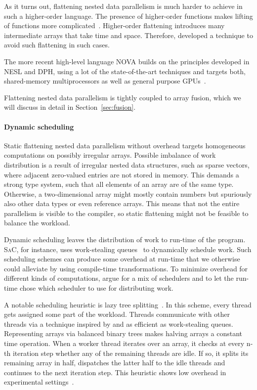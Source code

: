 \documentclass[a4paper]{article}
\newcommand{\sac}{S\textsc{a}C}
\begin{document}
As it turns out, flattening nested data parallelism is much harder to
achieve in such a higher-order language. The presence of higher-order
functions makes lifting of functions more
complicated~\cite{Lippmeier:2012:WEH:2364527.2364564}. Higher-order
flattening introduces many intermediate arrays that take time and
space. Therefore, \citet{Keller:2012:VA:2364506.2364512} developed a
technique to avoid such flattening in such cases.

The more recent high-level language NOVA builds on the principles
developed in NESL and DPH, using a lot of the state-of-the-art
techniques and targets both, shared-memory multiprocessors as well as
general purpose GPUs~\cite{Collins:2014:NFL:2627373.2627375}.

Flattening nested data parallelism is tightly coupled to array fusion,
which we will discuss in detail in Section~\ref{sec:fusion}.

\paragraph{Dynamic scheduling}

Static flattening nested data parallelism without overhead targets
homogeneous computations on possibly irregular arrays. Possible
imbalance of work distribution is a result of irregular nested data
structures, such as sparse vectors, where adjacent zero-valued entries
are not stored in memory. This demands a strong type system, such that
all elements of an array are of the same type. Otherwise, a
two-dimensional array might mostly contain numbers but spuriously also
other data types or even reference arrays. This means that not the
entire parallelism is visible to the compiler, so static flattening
might not be feasible to balance the workload.

Dynamic scheduling leaves the distribution of work to run-time of the
program. \sac{}, for instance, uses work-stealing
queues~\cite{Chase2005Dynamic, Grelck:2007:SOS:1248648.1248654} to
dynamically schedule work. Such scheduling schemes can produce some
overhead at run-time that we otherwise could alleviate by using
compile-time transformations. To minimize overhead for different kinds
of computations, \citet{Fluet:2008:SFG:1411204.1411239} argue for a
mix of schedulers and to let the run-time chose which scheduler to use
for distributing work.

A notable scheduling heuristic is lazy tree
splitting~\cite{Bergstrom:2010:LTS:1863543.1863558}. In this scheme,
every thread gets assigned some part of the workload. Threads
communicate with other threads via a technique inspired by and as
efficient as work-stealing queues. Representing arrays via balanced
binary trees makes halving arrays a constant time operation. When a
worker thread iterates over an array, it checks at every n-th
iteration step whether any of the remaining threads are idle. If so,
it splits its remaining array in half, dispatches the latter half to
the idle threads and continues to the next iteration step. This
heuristic shows low overhead in experimental
settings~\cite{Bergstrom:2010:LTS:1863543.1863558}.
\end{document}
